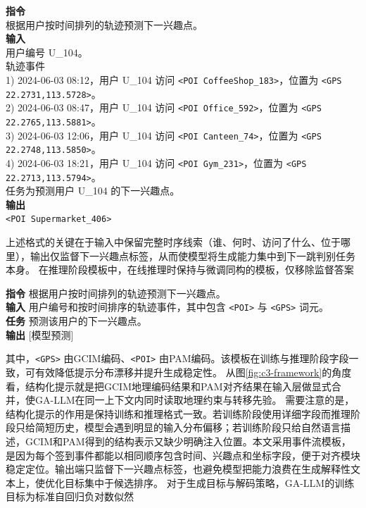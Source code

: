 \begin{promptbox}
\textbf{指令}\\
根据用户按时间排列的轨迹预测下一兴趣点。\\[2pt]
\textbf{输入}\\
用户编号 U\_104。\\
轨迹事件\\
1) 2024-06-03 08:12，用户 U\_104 访问 \texttt{<POI CoffeeShop\_183>}，位置为 \texttt{<GPS 22.2731,113.5728>}。\\
2) 2024-06-03 08:47，用户 U\_104 访问 \texttt{<POI Office\_592>}，位置为 \texttt{<GPS 22.2765,113.5881>}。\\
3) 2024-06-03 12:06，用户 U\_104 访问 \texttt{<POI Canteen\_74>}，位置为 \texttt{<GPS 22.2748,113.5850>}。\\
4) 2024-06-03 18:21，用户 U\_104 访问 \texttt{<POI Gym\_231>}，位置为 \texttt{<GPS 22.2713,113.5794>}。\\
任务为预测用户 U\_104 的下一兴趣点。\\[2pt]
\textbf{输出}\\
\texttt{<POI Supermarket\_406>}
\end{promptbox}
上述格式的关键在于输入中保留完整时序线索（谁、何时、访问了什么、位于哪里），输出仅监督下一兴趣点标签，从而使模型将生成能力集中到下一跳判别任务本身。
在推理阶段模板中，在线推理时保持与微调同构的模板，仅移除监督答案
\begin{promptbox}
\textbf{指令} 根据用户按时间排列的轨迹预测下一兴趣点。\\
\textbf{输入} 用户编号和按时间排序的轨迹事件，其中包含 \texttt{<POI>} 与 \texttt{<GPS>} 词元。\\
\textbf{任务} 预测该用户的下一兴趣点。\\
\textbf{输出} [模型预测]
\end{promptbox}
其中，\texttt{<GPS>} 由GCIM编码、\texttt{<POI>} 由PAM编码。该模板在训练与推理阶段字段一致，可有效降低提示分布漂移并提升生成稳定性。
从图\ref{fig:c3-framework}的角度看，结构化提示就是把GCIM地理编码结果和PAM对齐结果在输入层做显式合并，使GA-LLM在同一上下文内同时读取地理约束与转移先验。
需要注意的是，结构化提示的作用是保持训练和推理格式一致。若训练阶段使用详细字段而推理阶段只给简短历史，模型会遇到明显的输入分布偏移；若训练阶段只给自然语言描述，GCIM和PAM得到的结构表示又缺少明确注入位置。本文采用事件流模板，是因为每个签到事件都能以相同顺序包含时间、兴趣点和坐标字段，便于对齐模块稳定定位。输出端只监督下一兴趣点标签，也避免模型把能力浪费在生成解释性文本上，使优化目标集中于候选排序。
对于生成目标与解码策略，GA-LLM的训练目标为标准自回归负对数似然
